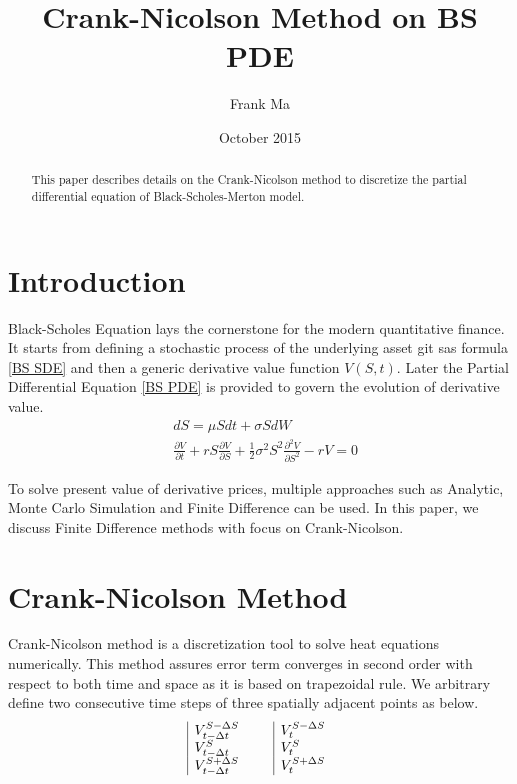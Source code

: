\documentclass{article}
\title{Crank-Nicolson Method on BS PDE}
\author{Frank Ma}
\date{October 2015}
\begin{document}
\maketitle

\begin{abstract}
    This paper describes details on the Crank-Nicolson method to discretize the partial differential equation of Black-Scholes-Merton model.
\end{abstract}


\section{Introduction}

Black-Scholes Equation lays the cornerstone for the modern quantitative finance.
It starts from defining a stochastic process of the underlying asset git sas formula \ref{BS SDE} and then a generic derivative value function $ V(S, t) $.
Later the Partial Differential Equation \ref{BS PDE} is provided to govern the evolution of derivative value.
\begin{align}
    & d S = \mu S d t + \sigma S d W \label{BS SDE} \\
    & \frac{\partial V}{\partial t} + r S \frac{\partial V}{\partial S} + \frac{1}{2} \sigma^2 S^2 \frac{\partial^2 V}{\partial S^2} - r V = 0 \label{BS PDE}
\end{align}

To solve present value of derivative prices, multiple approaches such as Analytic, Monte Carlo Simulation and Finite Difference can be used.
In this paper, we discuss Finite Difference methods with focus on Crank-Nicolson.


\section{Crank-Nicolson Method}

Crank-Nicolson method is a discretization tool to solve heat equations numerically.
This method assures error term converges in second order with respect to both time and space as it is based on trapezoidal rule.
We arbitrary define two consecutive time steps of three spatially adjacent points as below.
\begin{equation}
    \begin{array}{|l c|l}
        V_{t - \Delta t}^{S - \Delta S} & \quad & V_{t}^{S - \Delta S} \\
        V_{t - \Delta t}^{S} & \quad & V_{t}^{S} \\
        V_{t - \Delta t}^{S + \Delta S} & \quad & V_{t}^{S + \Delta S}
    \end{array}
\end{equation}
\end{document}
